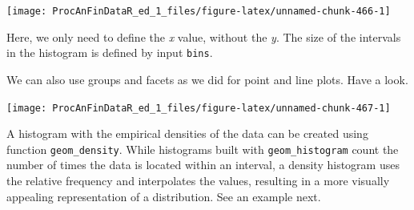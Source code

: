 \documentclass[11pt,]{book}
\newenvironment{Shaded}{\begin{snugshade}}{\end{snugshade}}
\newcommand{\KeywordTok}[1]{\textcolor[rgb]{0.27,0.27,0.27}{\textbf{#1}}}
\newcommand{\DataTypeTok}[1]{\textcolor[rgb]{0.27,0.27,0.27}{#1}}
\newcommand{\DecValTok}[1]{\textcolor[rgb]{0.06,0.06,0.06}{#1}}
\newcommand{\StringTok}[1]{\textcolor[rgb]{0.5,0.5,0.5}{#1}}
\newcommand{\CommentTok}[1]{\textcolor[rgb]{0.56,0.35,0.01}{\textit{#1}}}
\newcommand{\OperatorTok}[1]{\textcolor[rgb]{0.81,0.36,0.00}{\textbf{#1}}}
\newcommand{\NormalTok}[1]{#1}
\begin{document}
\begin{center}\texttt{[image: ProcAnFinDataR\_ed\_1\_files/figure-latex/unnamed-chunk-466-1]} \end{center}

Here, we only need to define the \emph{x} value, without the \emph{y}.
The size of the intervals in the histogram is defined by input
\texttt{bins}.

We can also use groups and facets as we did for point and line plots.
Have a look.

\begin{Shaded}
\end{Shaded}

\begin{center}\texttt{[image: ProcAnFinDataR\_ed\_1\_files/figure-latex/unnamed-chunk-467-1]} \end{center}

A histogram with the empirical densities of the data can be created
using function \texttt{geom\_density}. While histograms built with
\texttt{geom\_histogram} count the number of times the data is located
within an interval, a density histogram uses the relative frequency and
interpolates the values, resulting in a more visually appealing
representation of a distribution. See an example next.

\begin{Shaded}
\end{Shaded}
\end{document}
